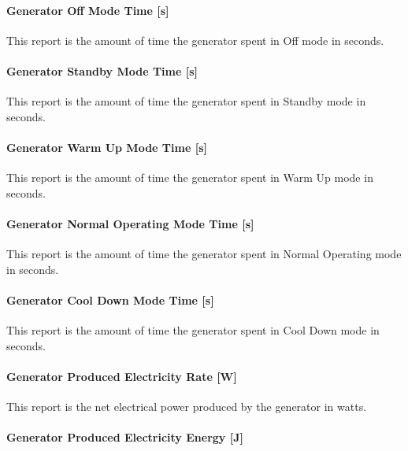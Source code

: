 \paragraph{Generator Off Mode Time {[}s{]}}\label{generator-off-mode-time-s}

This report is the amount of time the generator spent in Off mode in seconds.

\paragraph{Generator Standby Mode Time {[}s{]}}\label{generator-standby-mode-time-s}

This report is the amount of time the generator spent in Standby mode in seconds.

\paragraph{Generator Warm Up Mode Time {[}s{]}}\label{generator-warm-up-mode-time-s}

This report is the amount of time the generator spent in Warm Up mode in seconds.

\paragraph{Generator Normal Operating Mode Time {[}s{]}}\label{generator-normal-operating-mode-time-s}

This report is the amount of time the generator spent in Normal Operating mode in seconds.

\paragraph{Generator Cool Down Mode Time {[}s{]}}\label{generator-cool-down-mode-time-s}

This report is the amount of time the generator spent in Cool Down mode in seconds.

\paragraph{Generator Produced Electricity Rate {[}W{]}}\label{generator-produced-electric-power-w-2}

This report is the net electrical power produced by the generator in watts.

\paragraph{Generator Produced Electricity Energy {[}J{]}}\label{generator-produced-electric-energy-j-2}

